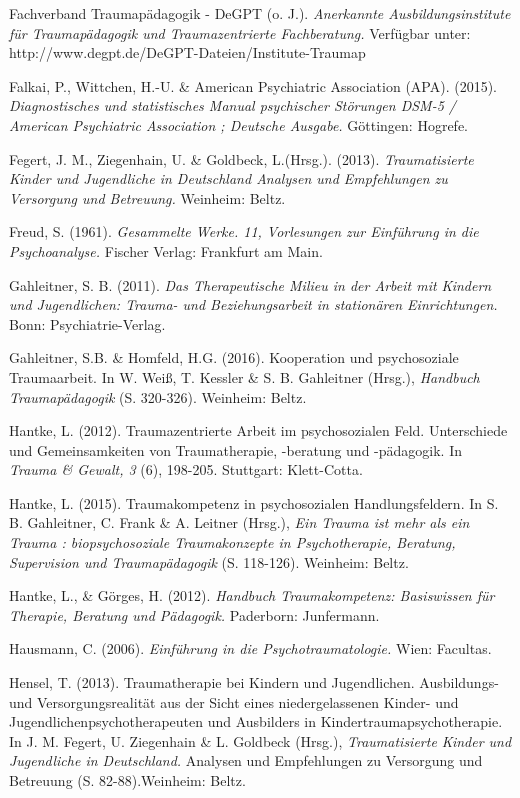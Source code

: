 \hang
Fachverband Traumapädagogik - DeGPT (o. J.). \textit{Anerkannte Ausbildungsinstitute für Traumapädagogik und Traumazentrierte Fachberatung.} Verfügbar unter: http://www.degpt.de/DeGPT-Dateien/Institute-Traumap%

\hang
Falkai, P., Wittchen, H.-U. \& American Psychiatric Association (APA). (2015). \textit{Diagnostisches und statistisches Manual psychischer Störungen DSM-5 / American Psychiatric Association ; Deutsche Ausgabe.} G{\"o}ttingen: Hogrefe.

\hang
Fegert, J. M., Ziegenhain, U. \& Goldbeck, L.(Hrsg.). (2013). \textit{Traumatisierte Kinder und Jugendliche in Deutschland Analysen und Empfehlungen zu Versorgung und Betreuung.} Weinheim: Beltz.

\hang
Freud, S. (1961). \textit{Gesammelte Werke. 11, Vorlesungen zur Einführung in die Psychoanalyse.} Fischer Verlag: Frankfurt am Main.

\hang
Gahleitner, S. B. (2011). \textit{Das Therapeutische Milieu in der Arbeit mit Kindern und Jugendlichen: Trauma- und Beziehungsarbeit in stationären Einrichtungen.} Bonn: Psychiatrie-Verlag.

\hang
Gahleitner, S.B. \& Homfeld, H.G. (2016). Kooperation und psychosoziale Traumaarbeit. In W. Weiß, T. Kessler \& S. B. Gahleitner (Hrsg.), \textit{Handbuch Traumapädagogik} (S. 320-326). Weinheim: Beltz.

\hang
Hantke, L. (2012). Traumazentrierte Arbeit im psychosozialen Feld. Unterschiede und Gemeinsamkeiten von Traumatherapie, -beratung und -pädagogik. In \textit{Trauma \& Gewalt, 3} (6), 198-205. Stuttgart: Klett-Cotta.

\hang
Hantke, L. (2015). Traumakompetenz in psychosozialen Handlungsfeldern. In S. B. Gahleitner, C. Frank \& A. Leitner (Hrsg.), \textit{Ein Trauma ist mehr als ein Trauma : biopsychosoziale Traumakonzepte in Psychotherapie, Beratung, Supervision und Traumapädagogik} (S. 118-126). Weinheim: Beltz.

\hang
Hantke, L., \& Görges, H. (2012). \textit{Handbuch Traumakompetenz: Basiswissen für Therapie, Beratung und Pädagogik.} Paderborn: Junfermann.

\hang
Hausmann, C. (2006). \textit{Einführung in die Psychotraumatologie.} Wien: Facultas.

\hang
Hensel, T. (2013). Traumatherapie bei Kindern und Jugendlichen. Ausbildungs- und Versorgungsrealit{\"a}t aus der Sicht eines niedergelassenen Kinder- und Jugendlichenpsychotherapeuten und Ausbilders in Kindertraumapsychotherapie. In J. M. Fegert, U. Ziegenhain \& L. Goldbeck (Hrsg.), \textit{Traumatisierte Kinder und Jugendliche in Deutschland.} Analysen und Empfehlungen zu Versorgung und Betreuung (S. 82-88).Weinheim: Beltz.

